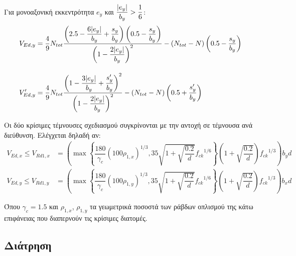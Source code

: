 Για μονοαξονική εκκεντρότητα $e_{y}$ και $\dfrac{\lvert e_y\rvert}{b_y} > \dfrac{1}{6}$:
\begin{subequations}
\begin{align}
  V_{Ed,y} & = \dfrac{4}{9}N_{tot}\dfrac{\left(2.5 - \dfrac{6\lvert e_y\rvert}{b_y} + \dfrac{s_y}{b_y}\right)\left(0.5 - \dfrac{s_y}{b_y}\right)}{\left(1-\dfrac{2\lvert e_y\rvert}{b_y}\right)^2} - \left(N_{tot} - N\right)\left(0.5 - \dfrac{s_y}{b_y}\right) \label{eqn:26a} \\[10pt]
  V'_{Ed,y} & = \dfrac{4}{9}N_{tot}\dfrac{\left(1 - \dfrac{3\lvert e_y\rvert}{b_y} + \dfrac{s'_y}{b_y}\right)^2}{\left(1-\dfrac{2\lvert e_y\rvert}{b_y}\right)^2} - \left(N_{tot} - N\right)\left(0.5 + \dfrac{s'_y}{b_y}\right) \label{eqn:26b}
\end{align}
\end{subequations}

Οι δύο κρίσιμες τέμνουσες σχεδιασμού συγκρίνονται με την αντοχή σε τέμνουσα ανά διεύθυνση. Ελέγχεται δηλαδή αν:
\begin{subequations}
\begin{align}
  V_{Ed,x} \leq V_{Rd1,x} & = \left(\max\left\{\dfrac{180}{{\gamma}_c}\left(100{\rho}_{1,x}\right)^{1/3}, 35\sqrt{1 + \sqrt{\dfrac{0.2}{d}}}{f_{ck}}^{1/6}\right\}\left(1 + \sqrt{\dfrac{0.2}{d}}\right){f_{ck}}^{1/3}\right){b_y}d\label{eqn:27a}\\[10pt]
  V_{Ed,y} \leq V_{Rd1,y} & = \left(\max\left\{\dfrac{180}{{\gamma}_c}\left(100{\rho}_{1,y}\right)^{1/3}, 35\sqrt{1 + \sqrt{\dfrac{0.2}{d}}}{f_{ck}}^{1/6}\right\}\left(1 + \sqrt{\dfrac{0.2}{d}}\right){f_{ck}}^{1/3}\right){b_x}d\label{eqn:27b}
\end{align}
\end{subequations}

Όπου ${\gamma}_c = 1.5$ και ${\rho}_{1,x}$, ${\rho}_{1,y}$ τα γεωμετρικά ποσοστά των ράβδων οπλισμού της κάτω επιφάνειας που διαπερνούν τις κρίσιμες διατομές.

\subsection{Διάτρηση}
